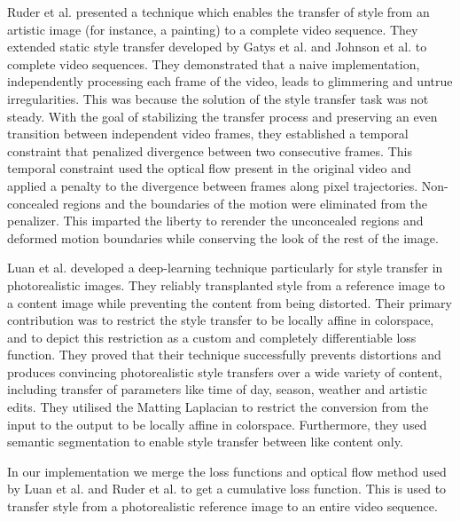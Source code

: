 \documentclass[runningheads]{llncs}
\begin{document}
Ruder et al. \cite{10.1007/978-3-319-45886-1_3} presented a technique which enables the transfer of style from an artistic image (for instance, a painting) to a complete video sequence. They extended static style transfer developed by  Gatys et al. \cite{gatys2016image} and  Johnson et al.\cite{johnson2016perceptual} to complete video sequences. They demonstrated that a naive implementation, independently processing each frame of the video, leads to glimmering and untrue irregularities. This was because the solution of the style transfer task was not steady. With the goal of stabilizing the transfer process and preserving an even transition between independent video frames, they established a temporal constraint that penalized divergence between two consecutive frames. This temporal constraint used the optical flow present in the original video and applied a penalty to the divergence between frames along pixel trajectories. Non-concealed regions and the boundaries of the motion were eliminated from the penalizer. This imparted the liberty to rerender the unconcealed regions and deformed motion boundaries while conserving the look of the rest of the image.

Luan et al. \cite{luan2017deep} developed a deep-learning technique particularly for style transfer in photorealistic images. They reliably transplanted style from a reference image to a content image while preventing the content from being distorted. Their primary contribution was to restrict the style transfer to be locally affine in colorspace, and to depict this restriction as a custom and completely differentiable loss function. They proved that their technique successfully prevents distortions and produces convincing photorealistic style transfers over a wide variety of content, including transfer of parameters like time of day, season, weather and artistic edits. They utilised the Matting Laplacian to restrict the conversion from the input to the output to be locally affine in colorspace. Furthermore, they used semantic segmentation to enable style transfer between like content only.

In our implementation we merge the loss functions and optical flow method used by Luan et al.\cite{luan2017deep} and Ruder et al. \cite{10.1007/978-3-319-45886-1_3} to get a cumulative loss function. This is used to transfer style from a photorealistic reference image to an entire video sequence.
\end{document}

